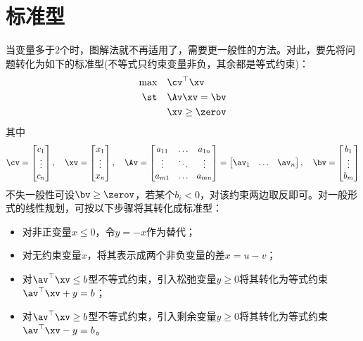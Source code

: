 \documentclass{ctexart}
\begin{document}
\section{标准型}

当变量多于$2$个时，图解法就不再适用了，需要更一般性的方法。对此，要先将问题转化为如下的标准型(不等式只约束变量非负，其余都是等式约束)：
\begin{align*}
    \max \quad & \cv^\top \xv   \\
    \st  \quad & \Av \xv = \bv  \\
               & \xv \ge \zerov
\end{align*}
其中
\begin{align*}
    \cv = \begin{bmatrix}
              c_1 \\ \vdots \\ c_n
          \end{bmatrix}, \quad
    \xv = \begin{bmatrix}
              x_1 \\ \vdots \\ x_n
          \end{bmatrix}, \quad
    \Av= \begin{bmatrix}
             a_{11} & \ldots & a_{1n} \\
             \vdots & \ddots & \vdots \\
             a_{m1} & \ldots & a_{mn}
         \end{bmatrix} = \begin{bmatrix}
                             \av_1 & \ldots & \av_n
                         \end{bmatrix}, \quad
    \bv = \begin{bmatrix}
              b_1 \\ \vdots \\ b_m
          \end{bmatrix}
\end{align*}
不失一般性可设$\bv \ge \zerov$，若某个$b_i < 0$，对该约束两边取反即可。对一般形式的线性规划，可按以下步骤将其转化成标准型：
\begin{itemize}
    \item 对非正变量$x \le 0$，令$y = -x$作为替代；
    \item 对无约束变量$x$，将其表示成两个非负变量的差$x = u - v$；
    \item 对$\av^\top \xv \le b$型不等式约束，引入松弛变量$y \ge 0$将其转化为等式约束$\av^\top \xv + y = b$；
    \item 对$\av^\top \xv \ge b$型不等式约束，引入剩余变量$y \ge 0$将其转化为等式约束$\av^\top \xv - y = b$。
\end{itemize}
\end{document}
